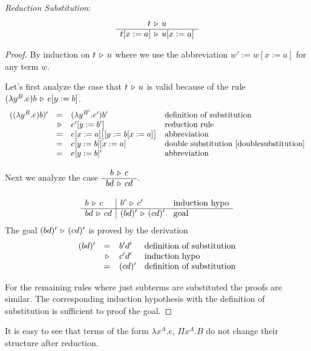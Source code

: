 \begin{lemma}
  \label{reductionsubstitution}
  \emph{Reduction Substitution}:
  $$
  \begin{array}{c} t \,\triangleright\, u
   \\ \hline t[x:=a] \,\triangleright\, u[x:=a]\end{array}
  $$
  \begin{proof} By induction on $t \,\triangleright\, u$ where we use the abbreviation
    $w' := w[x:=a]$ for any term $w$.

    Let's first analyze the case that $t \,\triangleright\, u$ is valid because of the
    rule $(\lambda y^B.e) b \,\triangleright\, e[y:=b]$.
    $$
    \begin{array}{llll}
      ((\lambda y^B.e) b)'
      &=& (\lambda y^{B'}. e') b'
      &\text{definition of substitution}
      \\
      &\,\triangleright\, & e'[y:=b'] &\text{reduction rule}
      \\
      &=& e[x:=a]\big[[y:=b[x:=a]\big]   &\text{abbreviation}
      \\
      &=& e[y:=b][x:=a]
      &\text{double substitution~\ref{doublesubstitution}}
      \\
      &=& e[y:=b]'  &\text{abbreviation}
    \end{array}
    $$

    Next we analyze the case $\begin{array}{c} b \,\triangleright\, c \\ \hline bd \,\triangleright\, cd\end{array}$.

    $$
    \begin{array}{l|ll}
      b \,\triangleright\, c    & b' \,\triangleright\, c' & \text{induction hypo}
      \\ \hline
      bd \,\triangleright\, cd  & (bd)' \,\triangleright\, (cd)' & \text{goal}
    \end{array}
    $$
    The goal $(bd)' \,\triangleright\, (cd)'$ is proved by the derivation
    $$
    \begin{array}{llll}
      (bd)'
      &=& b' d'        &\text{definition of substitution}
      \\
      &\,\triangleright\,& c' d'  &\text{induction hypo}
      \\
      &=& (cd)'        &\text{definition of substitution}
    \end{array}
    $$

    For the remaining rules where just subterms are substituted the proofs are
    similar. The corresponding induction hypothesis with the definition of
    substitution is sufficient to proof the goal.
  \end{proof}
\end{lemma}


It is easy to see that terms of the form $\lambda x^A.e$, $\Pi x^A.B$ do not
change their structure after reduction.

